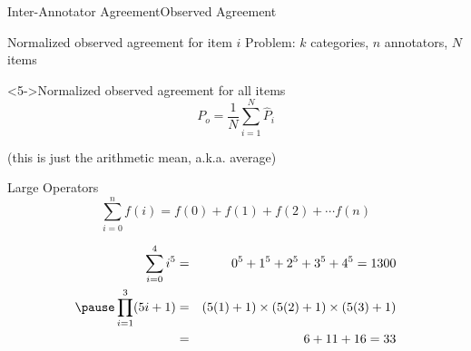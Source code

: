 \documentclass[aspectratio=169]{beamer}
\begin{document}
\begin{frame}{Inter-Annotator Agreement}{Observed Agreement}

\begin{block}{Normalized observed agreement for item $i$}
Problem: $k$ categories, $n$ annotators, $N$ items 
\end{block}

\begin{block}<5->{Normalized observed agreement for all items}
\begin{equation*}
	P_o = \frac{1}{N} \sum_{i=1}^N \hat P_i
\end{equation*}

(this is just the arithmetic mean, a.k.a. average)
\end{block}


\end{frame}

\begin{frame}{Large Operators}
\begin{equation*}
\sum_{i=0}^n f(i) = f(0) + f(1) + f(2) + \cdots f(n)
\end{equation*}
\pause
\begin{example}
\begin{eqnarray*}
\sum_{i=0}^4 i^5 & = & 0^5 + 1^5 + 2^5 + 3^5 + 4^5 = 1300\\
\pause
\prod_{i=1}^3 (5i+1) & = & (5(1)+1) \times (5(2)+1) \times (5(3)+1) \\
& = & 6+11+16 = 33\\
\end{eqnarray*}	
\end{example}
\end{frame}
\end{document}
